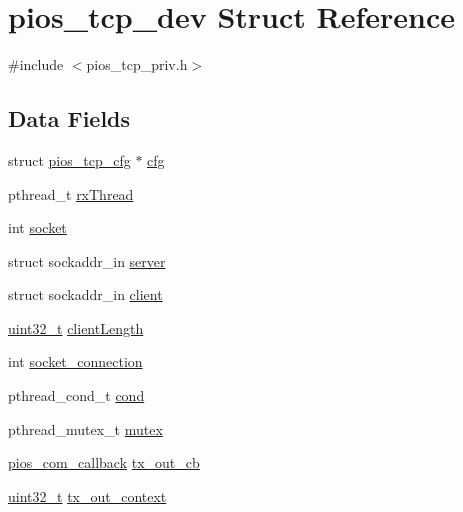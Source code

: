 \hypertarget{structpios__tcp__dev}{\section{pios\-\_\-tcp\-\_\-dev Struct Reference}
\label{structpios__tcp__dev}
}


{\ttfamily \#include $<$pios\-\_\-tcp\-\_\-priv.\-h$>$}

\subsection*{Data Fields}
\begin{DoxyCompactItemize}
\item 
struct \hyperlink{structpios__tcp__cfg}{pios\-\_\-tcp\-\_\-cfg} $\ast$ \hyperlink{structpios__tcp__dev_a8afddb370dbdf2eccb0810cc0ffe09fd}{cfg}
\item 
pthread\-\_\-t \hyperlink{structpios__tcp__dev_a48c0294adf726feb583ac5ddd52e2571}{rx\-Thread}
\item 
int \hyperlink{structpios__tcp__dev_ae7dc9c46e8630826bbce88df658dbf65}{socket}
\item 
struct sockaddr\-\_\-in \hyperlink{structpios__tcp__dev_af1058d8aa314e89f68108d5f8c7c1a89}{server}
\item 
struct sockaddr\-\_\-in \hyperlink{structpios__tcp__dev_a12cf1402bddf7d9f4b704a1222010977}{client}
\item 
\hyperlink{stdint_8h_a435d1572bf3f880d55459d9805097f62}{uint32\-\_\-t} \hyperlink{structpios__tcp__dev_ac4edcb8435a672cf41c471471f456020}{client\-Length}
\item 
int \hyperlink{structpios__tcp__dev_a8527742023dc82cbba21ba4bc3e9e787}{socket\-\_\-connection}
\item 
pthread\-\_\-cond\-\_\-t \hyperlink{structpios__tcp__dev_acae1aceab374a5fe741229c030477e7f}{cond}
\item 
pthread\-\_\-mutex\-\_\-t \hyperlink{structpios__tcp__dev_a227fec9048d1a386a5a7baf208bbbd09}{mutex}
\item 
\hyperlink{group___p_i_o_s___c_o_m_ga23f1888821f1f74a50c02adc459df597}{pios\-\_\-com\-\_\-callback} \hyperlink{structpios__tcp__dev_a10013d710f6d487f7051ae7f65a5a860}{tx\-\_\-out\-\_\-cb}
\item 
\hyperlink{stdint_8h_a435d1572bf3f880d55459d9805097f62}{uint32\-\_\-t} \hyperlink{structpios__tcp__dev_a044651f28c824dc2ab57223f1f5a0b35}{tx\-\_\-out\-\_\-context}
\item 

\end{DoxyCompactItemize}
